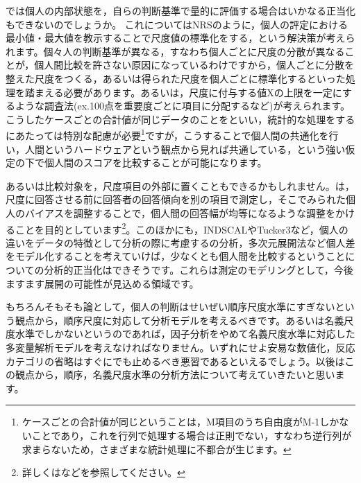 \documentclass{ltjsbook}
\begin{document}
では個人の内部状態を，自らの判断基準で量的に評価する場合はいかなる正当化もできないのでしょうか。
これについてはNRSのように，個人の評定における最小値・最大値を教示することで尺度値の標準化をする，という解決策が考えられます。個々人の判断基準が異なる，すなわち個人ごとに尺度の分散が異なることが，個人間比較を許さない原因になっているわけですから，個人ごとに分散を整えた尺度をつくる，あるいは得られた尺度を個人ごとに標準化するといった処理を踏まえる必要があります。あるいは，尺度に付与する値Xの上限を一定にするような調査法(ex.100点を重要度ごとに項目に分配するなど)が考えられます。こうしたケースごとの合計値が同じデータのことをといい，統計的な処理をするにあたっては特別な配慮が必要\footnote{ケースごとの合計値が同じということは，M項目のうち自由度がM-1しかないことであり，これを行列で処理する場合は正則でない，すなわち逆行列が求まらないため，さまざまな統計処理に不都合が生じます。}ですが，こうすることで個人間の共通化を行い，人間というハードウェアという観点から見れば共通している，という強い仮定の下で個人間のスコアを比較することが可能になります。

あるいは比較対象を，尺度項目の外部に置くこともできるかもしれません。は，尺度に回答させる前に回答者の回答傾向を別の項目で測定し，そこでみられた個人のバイアスを調整することで，個人間の回答幅が均等になるような調整をかけることを目的としています\footnote{詳しくは\citet{Hojodaiki2018}などを参照してください。}。このほかにも，INDSCALやTucker3など，個人の違いをデータの特徴として分析の際に考慮するの分析，多次元展開法など個人差をモデル化することを考えていけば，少なくとも個人間を比較するということについての分析的正当化はできそうです。これらは測定のモデリングとして，今後ますます展開の可能性が見込める領域です。

もちろんそもそも論として，個人の判断はせいぜい順序尺度水準にすぎないという観点から，順序尺度に対応して分析モデルを考えるべきです。あるいは名義尺度水準でしかないというのであれば，因子分析をやめて名義尺度水準に対応した多変量解析モデルを考えなければなりません。いずれにせよ安易な数値化，反応カテゴリの省略はすぐにでも止めるべき悪習であるといえるでしょう。以後はこの観点から，順序，名義尺度水準の分析方法について考えていきたいと思います。
\end{document}
